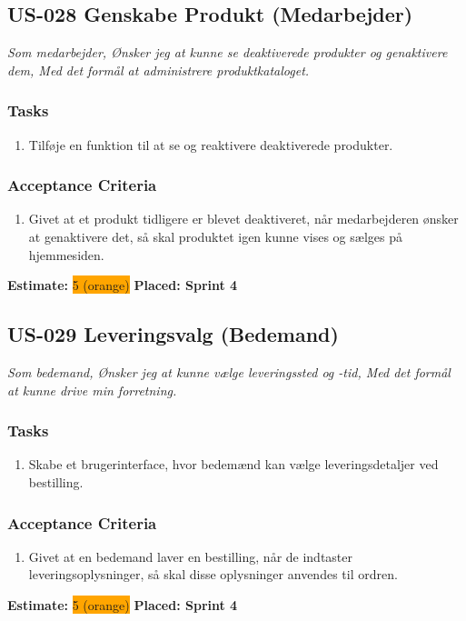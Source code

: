 \subsection{US-028 Genskabe Produkt (Medarbejder)}
\label{sec:US-028}
\textit{Som medarbejder, Ønsker jeg at kunne se deaktiverede produkter og genaktivere dem, Med det formål at administrere produktkataloget.}
\subsubsection*{\textbf{Tasks}}
\begin{enumerate}
  \item Tilføje en funktion til at se og reaktivere deaktiverede produkter.
\end{enumerate}
\subsubsection*{\textbf{Acceptance Criteria}}
\begin{enumerate}
  \item Givet at et produkt tidligere er blevet deaktiveret, når medarbejderen ønsker at genaktivere det, så skal produktet igen kunne vises og sælges på hjemmesiden.
\end{enumerate}
\textbf{Estimate:} \colorbox{orange}{5 (orange)}
\textbf{Placed: Sprint 4}
\par\noindent\dotfill

\subsection{US-029 Leveringsvalg (Bedemand)}
\label{sec:US-029}
\textit{Som bedemand, Ønsker jeg at kunne vælge leveringssted og -tid, Med det formål at kunne drive min forretning.}
\subsubsection*{\textbf{Tasks}}
\begin{enumerate}
  \item Skabe et brugerinterface, hvor bedemænd kan vælge leveringsdetaljer ved bestilling.
\end{enumerate}
\subsubsection*{\textbf{Acceptance Criteria}}
\begin{enumerate}
  \item Givet at en bedemand laver en bestilling, når de indtaster leveringsoplysninger, så skal disse oplysninger anvendes til ordren.
\end{enumerate}
\textbf{Estimate:} \colorbox{orange}{5 (orange)}
\textbf{Placed: Sprint 4}
\par\noindent\dotfill

